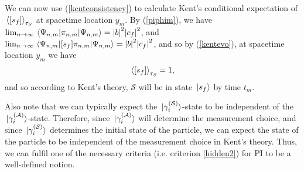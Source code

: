 We can now use (\ref{kentconsistency}) to calculate Kent's conditional expectation of $\ev*{[s_f]}_{\tau_S}$ at spacetime location $y_m$. By (\ref{piphim}), we have  $\lim_{n\rightarrow\infty}\ev*{\pi_{n,m}}{\Psi_{n,m}}=\abs{b}^2 \abs{c_f}^2 $, and $\lim_{n\rightarrow\infty}\ev*{[s_f] \pi_{n,m}}{\Psi_{n,m}}=\abs{b}^2 \abs{c_f}^2 $, and so by (\ref{kentevo}), at spacetime location $y_m$ we have
\begin{equation*}
 \ev*{[s_f]}_{\tau_S}=1,
\end{equation*}
and so according to Kent's theory, $\mathcal{S}$ will be in state $\ket*{s_f}$ by time $t_m$.

Also note that we can typically expect the $\ket*{\gamma_i^{(\mathcal{S})}}$-state to be independent of the $\ket*{\gamma_i^{(\mathcal{A})}}$-state. Therefore, since $\ket*{\gamma_i^{(\mathcal{A})}}$ will determine the measurement choice, and since $\ket*{\gamma_i^{(\mathcal{S})}}$ determines the initial state of the particle, we can expect the state of the particle to be independent of the measurement choice in Kent's theory. Thus, we can fulfil one of the necessary criteria (i.e. criterion \ref{hidden2}) for PI to be a well-defined notion.

